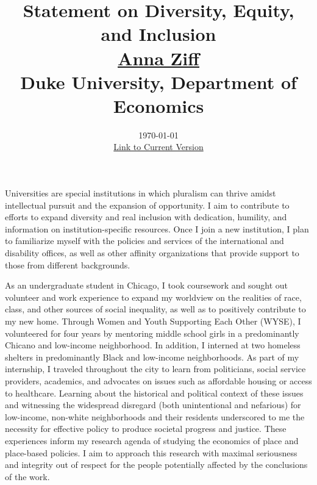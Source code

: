 


\setlength{\parskip}{\baselineskip}%
\setlength{\parindent}{0pt}%
\setlength{\droptitle}{-5em}

\title{\normalsize \textbf{Statement on Diversity, Equity, and Inclusion} \\ \href{https://aziff.github.io}{Anna Ziff} \\ Duke University, Department of Economics}
\date{\vspace{-2.25cm} \normalsize \today \\ \href{https://www.dropbox.com/scl/fi/vt1wcqmt9b7r1oouowp91/AnnaZiff_DiversityStatement.pdf?rlkey=w8rojl4nlqylzhvie7lxkfsf0&dl=0}{Link to Current Version}}
\maketitle

Universities are special institutions in which pluralism can thrive amidst intellectual pursuit and the expansion of opportunity. I aim to contribute to efforts to expand diversity and real inclusion with dedication, humility, and information on institution-specific resources. Once I join a new institution, I plan to familiarize myself with the policies and services of the international and disability offices, as well as other affinity organizations that provide support to those from different backgrounds. 

As an undergraduate student in Chicago, I took coursework and sought out volunteer and work experience to expand my worldview on the realities of race, class, and other sources of social inequality, as well as to positively contribute to my new home. Through Women and Youth Supporting Each Other (WYSE), I volunteered for four years by mentoring middle school girls in a predominantly Chicano and low-income neighborhood. In addition, I interned at two homeless shelters in predominantly Black and low-income neighborhoods. As part of my internship, I traveled throughout the city to learn from politicians, social service providers, academics, and advocates on issues such as affordable housing or access to healthcare. Learning about the historical and political context of these issues and witnessing the widespread disregard (both unintentional and nefarious) for low-income, non-white neighborhoods and their residents underscored to me the necessity for effective policy to produce societal progress and justice. These experiences inform my research agenda of studying the economics of place and place-based policies. I aim to approach this research with maximal seriousness and integrity out of respect for the people potentially affected by the conclusions of the work.


